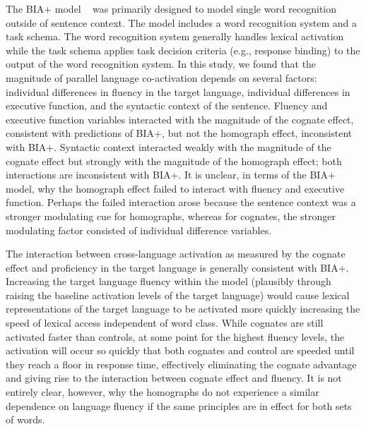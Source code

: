 The BIA+ model ~\citep{Dijkstra2002} was primarily designed to model single word recognition outside of sentence context. The model includes a word recognition system and a task schema. The word recognition system generally handles lexical activation while the task schema applies task decision criteria (e.g., response binding) to the output of the word recognition system. In this study, we found that the magnitude of parallel language co-activation depends on several factors: individual differences in fluency in the target language, individual differences in executive function, and the syntactic context of the sentence. Fluency and executive function variables interacted with the magnitude of the cognate effect, consistent with predictions of BIA+, but not the homograph effect, inconsistent with BIA+. Syntactic context interacted weakly with the magnitude of the cognate effect but strongly with the magnitude of the homograph effect; both interactions are inconsistent with BIA+. It is unclear, in terms of the BIA+ model, why the homograph effect failed to interact with fluency and executive function. Perhaps the failed interaction arose because the sentence context was a stronger modulating cue for homographs, whereas for cognates, the stronger modulating factor consisted of individual difference variables. 

The interaction between cross-language activation as measured by the cognate effect and proficiency in the target language is generally consistent with BIA+. Increasing the target language fluency within the model (plausibly through raising the baseline activation levels of the target language) would cause lexical representations of the target language to be activated more quickly increasing the speed of lexical access independent of word class. While cognates are still activated faster than controls, at some point for the highest fluency levels, the activation will occur so quickly that both cognates and control are speeded until they reach a floor in response time, effectively eliminating the cognate advantage and giving rise to the interaction between cognate effect and fluency. It is not entirely clear, however, why the homographs do not experience a similar dependence on language fluency if the same principles are in effect for both sets of words. 

